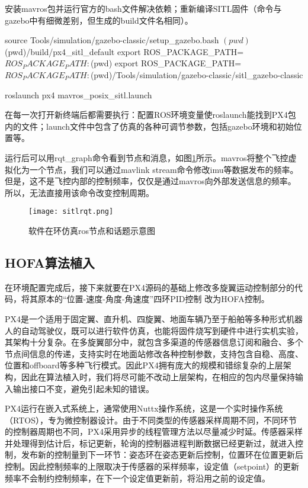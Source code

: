 安装mavros包并运行官方的bash文件解决依赖；重新编译SITL固件（命令与gazebo中有细微差别，但生成的build文件名相同）。
\begin{codeblock}[language=C]
  source Tools/simulation/gazebo-classic/setup_gazebo.bash $(pwd) $(pwd)/build/px4_sitl_default
  export ROS_PACKAGE_PATH=$ROS_PACKAGE_PATH:$(pwd)
  export ROS_PACKAGE_PATH=$ROS_PACKAGE_PATH:$(pwd)/Tools/simulation/gazebo-classic/sitl_gazebo-classic

  roslaunch px4 mavros_posix_sitl.launch
\end{codeblock}


在每一次打开新终端后都需要执行：配置ROS环境变量使roslaunch能找到PX4包内的文件；launch文件中包含了仿真的各种可调节参数，包括gazebo环境和初始位置等。

运行后可以用rqt\_graph命令看到节点和消息，如图\ref{sitlrqt}所示。mavros将整个飞控虚拟化为一个节点，我们可以通过mavlink stream命令修改imu等数据发布的频率。但是，这不是飞控内部的控制频率，仅仅是通过mavros向外部发送信息的频率。所以，无法直接用该命令改变控制周期。
\begin{figure}[!h]
  \centering
  \texttt{[image: sitlrqt.png]}
  \caption{软件在环仿真ros节点和话题示意图}
  \label{sitlrqt}
\end{figure}

 \subsection{HOFA算法植入}
在环境配置完成后，接下来就要在PX4源码的基础上修改多旋翼运动控制部分的代码，将其原本的“位置-速度-角度-角速度”四环PID控制 \cite{px4控制}改为HOFA控制。

PX4是一个适用于固定翼、直升机、四旋翼、地面车辆乃至于船舶等多种形式机器人的自动驾驶仪，既可以进行软件仿真，也能将固件烧写到硬件中进行实机实验，其架构十分复杂。在多旋翼部分中，就包含多渠道的传感器信息订阅和融合、多个节点间信息的传递，支持实时在地面站修改各种控制参数，支持包含自稳、高度、位置和offboard等多种飞行模式。因此PX4拥有庞大的规模和错综复杂的上层架构，因此在算法植入时，我们将尽可能不改动上层架构，在相应的包内尽量保持输入输出接口不变，避免引起未知的错误。

PX4运行在嵌入式系统上，通常使用Nuttx操作系统，这是一个实时操作系统（RTOS），专为微控制器设计。由于不同类型的传感器采样周期不同，不同环节的控制器周期也不同，PX4采用异步的线程管理方法以尽量减少时延。传感器采样并处理得到估计后，标记更新，轮询的控制器进程判断数据已经更新过，就进入控制，发布新的控制量到下一环节：姿态环在姿态更新后控制，位置环在位置更新后控制。因此控制频率的上限取决于传感器的采样频率，设定值（setpoint）的更新频率不会制约控制频率，在下一个设定值更新前，将沿用之前的设定值。

